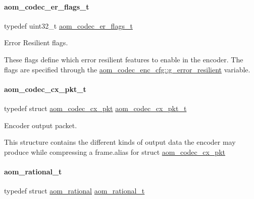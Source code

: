 \paragraph{\texorpdfstring{aom\+\_\+codec\+\_\+er\+\_\+flags\+\_\+t}{aom\_codec\_er\_flags\_t}}
{\footnotesize\ttfamily typedef uint32\+\_\+t \hyperlink{group__encoder_ga5f326af84993f371bb165883bb5a5a59}{aom\+\_\+codec\+\_\+er\+\_\+flags\+\_\+t}}



Error Resilient flags. 

These flags define which error resilient features to enable in the encoder. The flags are specified through the \hyperlink{structaom__codec__enc__cfg_a8f3763485bb1f6eea6466b2fe0da2304}{aom\+\_\+codec\+\_\+enc\+\_\+cfg\+::g\+\_\+error\+\_\+resilient} variable. \mbox{\label{group__encoder_ga2373bdec1f53ddb0736c53a5ebce7b7b}} 
\paragraph{\texorpdfstring{aom\+\_\+codec\+\_\+cx\+\_\+pkt\+\_\+t}{aom\_codec\_cx\_pkt\_t}}
{\footnotesize\ttfamily typedef struct \hyperlink{structaom__codec__cx__pkt}{aom\+\_\+codec\+\_\+cx\+\_\+pkt}  \hyperlink{group__encoder_ga2373bdec1f53ddb0736c53a5ebce7b7b}{aom\+\_\+codec\+\_\+cx\+\_\+pkt\+\_\+t}}



Encoder output packet. 

This structure contains the different kinds of output data the encoder may produce while compressing a frame.\+alias for struct \hyperlink{structaom__codec__cx__pkt}{aom\+\_\+codec\+\_\+cx\+\_\+pkt} \mbox{\label{group__encoder_ga89310b75f722a6f3ee5e88d9b0f5853f}} 
\paragraph{\texorpdfstring{aom\+\_\+rational\+\_\+t}{aom\_rational\_t}}
{\footnotesize\ttfamily typedef struct \hyperlink{structaom__rational}{aom\+\_\+rational}  \hyperlink{group__encoder_ga89310b75f722a6f3ee5e88d9b0f5853f}{aom\+\_\+rational\+\_\+t}}



